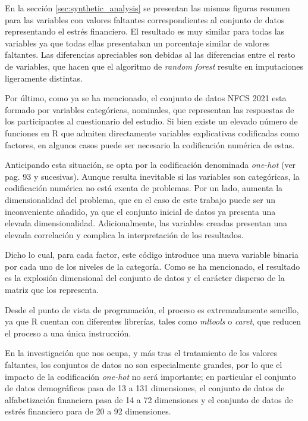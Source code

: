 \documentclass[a4paper, 11pt]{article}
\begin{document}
En la sección \ref{sec:synthetic_analysis} se presentan las mismas figuras resumen
para las variables con valores faltantes correspondientes al conjunto de datos 
representando el estrés financiero. El resultado es muy similar para todas las 
variables ya que todas ellas presentaban un porcentaje similar de valores faltantes.
Las diferencias apreciables son debidas al las diferencias entre el resto de variables,
que hacen que el algoritmo de \textit{random forest} resulte en imputaciones ligeramente distintas.

Por último, como ya se ha mencionado, el conjunto de datos NFCS 2021 esta formado por
variables categóricas, nominales, que representan las respuestas de los participantes
al cuestionario del estudio. Si bien existe un elevado número de funciones en R que 
admiten directamente variables explicativas codificadas como factores, en algunos
casos puede ser necesario la codificación numérica de estas. 

Anticipando esta situación,
se opta por la codificación denominada \textit{one-hot} (ver \cite{lantz23} pag. 93 y 
sucesivas). Aunque resulta inevitable si las variables son categóricas, la codificación
numérica no está exenta de problemas. Por un lado, aumenta la dimensionalidad del
problema, que en el caso de este trabajo puede ser un inconveniente añadido, ya que
el conjunto inicial de datos ya presenta una elevada dimensionalidad. Adicionalmente, 
las variables creadas presentan una elevada correlación y complica la interpretación de
los resultados.

Dicho lo cual, para cada factor, este código introduce una nueva variable binaria
por cada uno de los niveles de la categoría. Como se ha mencionado, el resultado es
la explosión dimensional del conjunto de datos y el carácter disperso de la matriz
que los representa. 

Desde el punto de vista de programación, el proceso es extremadamente sencillo, ya que R cuentan con diferentes librerías, tales como \textit{mltools} o \textit{caret}, que reducen el proceso a una única instrucción.

En la investigación que nos ocupa, y más tras el tratamiento de los valores faltantes, los
conjuntos de datos no son especialmente grandes, por lo que el impacto de la codificación
\textit{one-hot} no será importante; en particular el conjunto de datos demográficos pasa
de 13 a 131 dimensiones, el conjunto de datos de alfabetización financiera pasa de 14 a 72
dimensiones y el conjunto de datos de estrés financiero para de 20 a 92 dimensiones.
\end{document}

